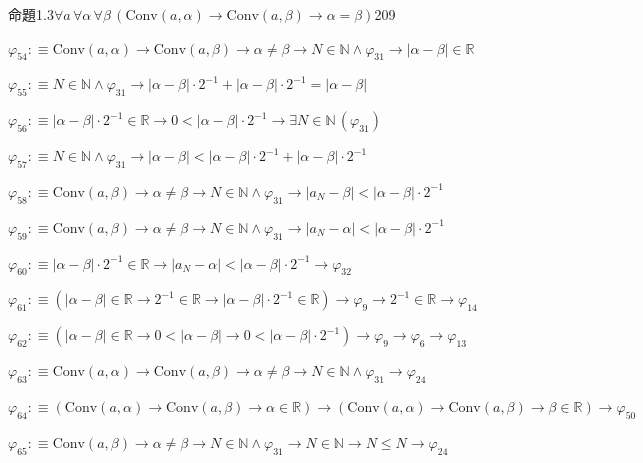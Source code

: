 \begin{fullproof}{命題1.3}{$\forall a\,\forall \alpha\,\forall \beta\,(\mathrm{Conv}(a,\alpha) \to \mathrm{Conv}(a,\beta) \to \alpha = \beta)$}{209}
\begin{abbrevlist}
\item $\varphi_{54} :\equiv \mathrm{Conv}(a,\alpha) \to \mathrm{Conv}(a,\beta) \to \alpha \neq \beta \to N \in \mathbb{N} \land \varphi_{31} \to \lvert \alpha - \beta \rvert \in \mathbb{R}$
\item $\varphi_{55} :\equiv N \in \mathbb{N} \land \varphi_{31} \to \lvert \alpha - \beta \rvert \cdot 2^{-1} + \lvert \alpha - \beta \rvert \cdot 2^{-1} = \lvert \alpha - \beta \rvert$
\item $\varphi_{56} :\equiv \lvert \alpha - \beta \rvert \cdot 2^{-1} \in \mathbb{R} \to 0 < \lvert \alpha - \beta \rvert \cdot 2^{-1} \to \exists N \in \mathbb{N}\,(\varphi_{31})$
\item $\varphi_{57} :\equiv N \in \mathbb{N} \land \varphi_{31} \to \lvert \alpha - \beta \rvert < \lvert \alpha - \beta \rvert \cdot 2^{-1} + \lvert \alpha - \beta \rvert \cdot 2^{-1}$
\item $\varphi_{58} :\equiv \mathrm{Conv}(a,\beta) \to \alpha \neq \beta \to N \in \mathbb{N} \land \varphi_{31} \to \lvert a_{N} - \beta \rvert < \lvert \alpha - \beta \rvert \cdot 2^{-1}$
\item $\varphi_{59} :\equiv \mathrm{Conv}(a,\beta) \to \alpha \neq \beta \to N \in \mathbb{N} \land \varphi_{31} \to \lvert a_{N} - \alpha \rvert < \lvert \alpha - \beta \rvert \cdot 2^{-1}$
\item $\varphi_{60} :\equiv \lvert \alpha - \beta \rvert \cdot 2^{-1} \in \mathbb{R} \to \lvert a_{N} - \alpha \rvert < \lvert \alpha - \beta \rvert \cdot 2^{-1} \to \varphi_{32}$
\item $\varphi_{61} :\equiv (\lvert \alpha - \beta \rvert \in \mathbb{R} \to 2^{-1} \in \mathbb{R} \to \lvert \alpha - \beta \rvert \cdot 2^{-1} \in \mathbb{R}) \to \varphi_{9} \to 2^{-1} \in \mathbb{R} \to \varphi_{14}$
\item $\varphi_{62} :\equiv (\lvert \alpha - \beta \rvert \in \mathbb{R} \to 0 < \lvert \alpha - \beta \rvert \to 0 < \lvert \alpha - \beta \rvert \cdot 2^{-1}) \to \varphi_{9} \to \varphi_{6} \to \varphi_{13}$
\item $\varphi_{63} :\equiv \mathrm{Conv}(a,\alpha) \to \mathrm{Conv}(a,\beta) \to \alpha \neq \beta \to N \in \mathbb{N} \land \varphi_{31} \to \varphi_{24}$
\item $\varphi_{64} :\equiv (\mathrm{Conv}(a,\alpha) \to \mathrm{Conv}(a,\beta) \to \alpha \in \mathbb{R}) \to (\mathrm{Conv}(a,\alpha) \to \mathrm{Conv}(a,\beta) \to \beta \in \mathbb{R}) \to \varphi_{50}$
\item $\varphi_{65} :\equiv \mathrm{Conv}(a,\beta) \to \alpha \neq \beta \to N \in \mathbb{N} \land \varphi_{31} \to N \in \mathbb{N} \to N \leq N \to \varphi_{24}$

\end{abbrevlist}
\end{fullproof}
